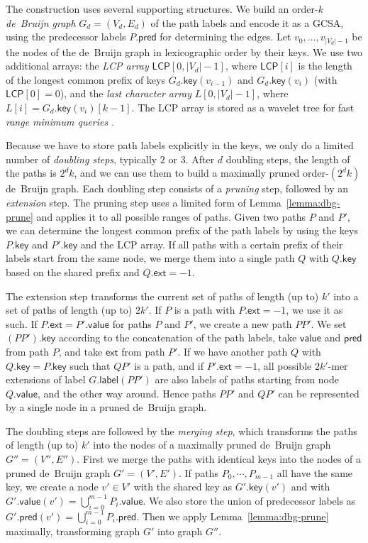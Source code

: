 \documentclass[a4paper,11pt]{llncs}
\newcommand{\abs}[1]{\ensuremath{\lvert #1 \rvert}}
\newcommand{\glabel}{\ensuremath{\mathsf{label}}}
\newcommand{\gpred}{\ensuremath{\mathsf{pred}}}
\newcommand{\gkey}{\ensuremath{\mathsf{key}}}
\newcommand{\gvalue}{\ensuremath{\mathsf{value}}}
\newcommand{\gext}{\ensuremath{\mathsf{ext}}}
\newcommand{\kmer}[1]{$#1$\nobreakdash-mer}
\newcommand{\orderk}[1]{order\nobreakdash-$#1$}
\newcommand{\LCP}{\ensuremath{\mathsf{LCP}}}
\begin{document}
The construction uses several supporting structures. We build an \orderk{k} \emph{de~Bruijn graph} $G_{d} = (V_{d}, E_{d})$ of the path labels and encode it as a GCSA, using the predecessor labels $P.\gpred$ for determining the edges. Let $v_{0}, \dotsc, v_{\abs{V_{d}}-1}$ be the nodes of the de~Bruijn graph in lexicographic order by their keys. We use two additional arrays: the \emph{LCP array} $\LCP[0, \abs{V_{d}}-1]$, where $\LCP[i]$ is the length of the longest common prefix of keys $G_{d}.\gkey(v_{i-1})$ and $G_{d}.\gkey(v_{i})$ (with $\LCP[0] = 0$), and the \emph{last character array} $L[0, \abs{V_{d}}-1]$, where $L[i] = G_{d}.\gkey(v_{i})[k-1]$. The LCP array is stored as a wavelet tree for fast \emph{range minimum queries} \cite{Gagie2012a}.

Because we have to store path labels explicitly in the keys, we only do a limited number of \emph{doubling steps}, typically $2$ or $3$. After $d$ doubling steps, the length of the paths is $2^{d} k$, and we can use them to build a maximally pruned \orderk{(2^{d} k)} de~Bruijn graph. Each doubling step consists of a \emph{pruning} step, followed by an \emph{extension} step. The pruning step uses a limited form of Lemma~\ref{lemma:dbg-prune} and applies it to all possible ranges of paths. Given two paths $P$ and $P'$, we can determine the longest common prefix of the path labels by using the keys $P.\gkey$ and $P'.\gkey$ and the LCP array. If all paths with a certain prefix of their labels start from the same node, we merge them into a single path $Q$ with $Q.\gkey$ based on the shared prefix and $Q.\gext = -1$.

The extension step transforms the current set of paths of length (up to) $k'$ into a set of paths of length (up to) $2k'$. If $P$ is a path with $P.\gext = -1$, we use it as such. If $P.\gext = P'.\gvalue$ for paths $P$ and $P'$, we create a new path $PP'$. We set $(PP').\gkey$ according to the concatenation of the path labels, take $\gvalue$ and $\gpred$ from path $P$, and take $\gext$ from path $P'$. If we have another path $Q$ with $Q.\gkey = P.\gkey$ such that $QP'$ is a path, and if $P'.\gext = -1$, all possible \kmer{2k'} extensions of label $G.\glabel(PP')$ are also labels of paths starting from node $Q.\gvalue$, and the other way around. Hence paths $PP'$ and $QP'$ can be represented by a single node in a pruned de~Bruijn graph.

The doubling steps are followed by the \emph{merging step}, which transforms the paths of length (up to) $k'$ into the nodes of a maximally pruned de~Bruijn graph $G'' = (V'', E'')$. First we merge the paths with identical keys into the nodes of a pruned de~Bruijn graph $G' = (V', E')$. If paths $P_{0}, \dotsm, P_{m-1}$ all have the same key, we create a node $v' \in V'$ with the shared key as $G'.\gkey(v')$ and with $G'.\gvalue(v') = \bigcup_{i=0}^{m-1} P_{i}.\gvalue$. We also store the union of predecessor labels as $G'.\gpred(v') = \bigcup_{i=0}^{m-1} P_{i}.\gpred$. Then we apply Lemma~\ref{lemma:dbg-prune} maximally, transforming graph $G'$ into graph $G''$.
\end{document}

